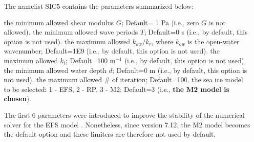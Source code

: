 The namelist {\F SIC5} contains the parameters summarized below:
\begin{clist}
 {the minimum allowed shear modulus $G$; Default= 1 Pa (i.e., zero $G$ is not allowed).}
%
 {the minimum allowed wave periods $T$; Default=0 s (i.e., by default, this option is not used).}
%
 {the maximum allowed $k_{ow}/k_r$, where $k_{ow}$ is the open-water wavenumber; Default=1E9 (i.e., by default, this option is not used).}
%
 {the maximum allowed $k_i$; Default=100 m$^{-1}$ (i.e., by default, this option is not used).}
%
 {the minimum allowed water depth $d$; Default=0 m (i.e., by default, this option is not used).}
%
 {the maximum allowed \# of iteration; Default=100.}
%
 {the sea ice model to be selected: 1 - {\code EFS}, 2 - {\code RP}, 3 - {\code M2}; Default=3 (i.e., \textbf{the {\code M2} model is chosen}).}
\end{clist}
The first 6 parameters were introduced to improve the stability of the numerical solver for the EFS model \citep[the solver may fail for small wave periods in some rare cases, particularly for shallow water depth $d$ and low $G$; see][]{Liu2020}. Nonetheless, since version 7.12, the M2 model becomes the default option and these limiters are therefore not used by default.
